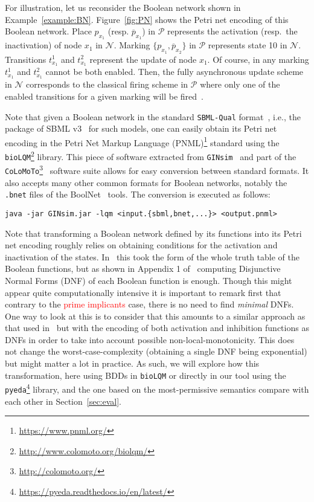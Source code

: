 \documentclass[preprint,12pt]{elsarticle}
\newcommand{\change}[1]{\textcolor{red}{#1}}
\begin{document}
For illustration, let us reconsider the Boolean network shown in Example~\ref{example:BN}.
Figure~\ref{fig:PN} shows the Petri net encoding of this Boolean network.
Place \(p_{x_1}\) (resp. \(\overline{p}_{x_1}\)) in \(\mathcal{P}\) represents the activation (resp.\ the inactivation) of node \(x_1\) in \(\mathcal{N}\).
Marking \(\{p_{x_1}, \overline{p}_{x_2}\}\) in \(\mathcal{P}\) represents state 10 in \(\mathcal{N}\).
Transitions \(t^{1}_{x_1}\) and \(t^{2}_{x_1}\) represent the update of node \(x_1\).
Of course, in any marking \(t^{1}_{x_1}\) and \(t^{2}_{x_1}\) cannot be both enabled.
Then, the fully asynchronous update scheme in \(\mathcal{N}\) corresponds to the classical firing scheme in \(\mathcal{P}\) where only one of the enabled transitions for a given marking will be fired~\cite{Murata1989}.


Note that given a Boolean network in the standard \texttt{SBML-Qual} format~\cite{chaouiya2013sbml}, i.e., the package of SBML v3~\cite{keating2020sbml} for such models, one can easily obtain its Petri net encoding in the Petri Net Markup Language  (PNML)\footnote{\url{https://www.pnml.org/}} standard using the \texttt{bioLQM}\footnote{\url{http://www.colomoto.org/biolqm/}} library.
This piece of software extracted from \texttt{GINsim}~\cite{chaouiya2012logical} and part of the \texttt{CoLoMoTo}\footnote{\url{http://colomoto.org/}}~\cite{naldi2015cooperative} software suite allows for easy conversion between standard formats.
It also accepts many other common formats for Boolean networks, notably the \verb|.bnet| files of the  BoolNet~\cite{mussel2010boolnet,klarner2017pyboolnet} tools.
The conversion is executed as follows:

{\small \verb|java -jar GINsim.jar -lqm <input.{sbml,bnet,...}> <output.pnml>|}

Note that transforming a Boolean network defined by its functions into its Petri net encoding roughly relies on obtaining conditions for the activation and inactivation of the states. In~\cite{chaouiya2004qualitative} this took the form of the whole truth table of the Boolean functions, but as shown in Appendix 1 of~\cite{chatain2014characterization} computing Disjunctive Normal Forms (DNF) of each Boolean function is enough.
Though this might appear quite computationally intensive it is important to remark first that contrary to the \change{prime implicants} case, there is no need to find \emph{minimal} DNFs.
One way to look at this is to consider that this amounts to a similar approach as that used in~\cite{DBLP:conf/ictai/ChevalierFPZ19} but with the encoding of both activation and inhibition functions as DNFs in order to take into account possible non-local-monotonicity.
This does not change the worst-case-complexity (obtaining a single DNF being exponential) but might matter a lot in practice.
As such, we will explore how this transformation, here using BDDs in \texttt{bioLQM} or directly in our tool using the \texttt{pyeda}\footnote{\url{https://pyeda.readthedocs.io/en/latest/}} library, and the one based on the most-permissive semantics compare with each other in Section~\ref{sec:eval}.
\end{document}
